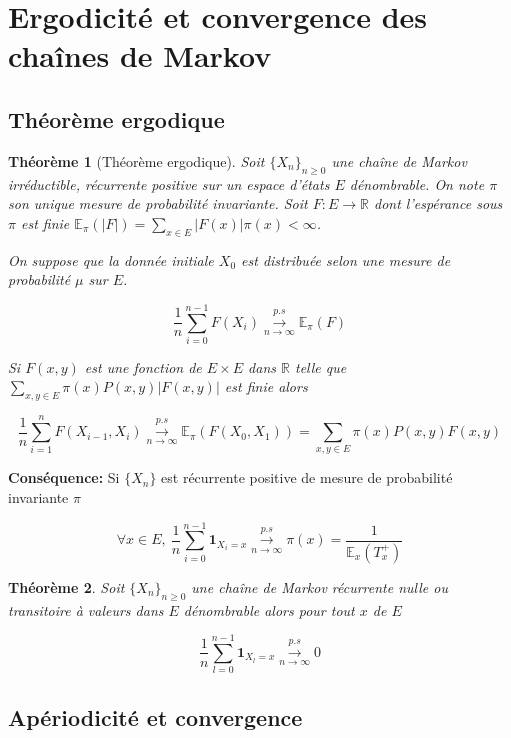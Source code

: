 \documentclass[10pt,a4paper,oneside]{article}
\newtheorem{theoreme}{Théorème}
\begin{document}
\section{Ergodicité et convergence des chaînes de Markov}

\subsection{Théorème ergodique}

\begin{theoreme}[Théorème ergodique]
Soit $\{ X_n \}_{n \geq 0}$ une chaîne de Markov irréductible, récurrente positive sur un espace d'états $E$ dénombrable. On note $\pi$ son unique mesure de probabilité invariante. Soit $F:E \to \mathbb{R}$ dont l'espérance sous $\pi$ est finie $\mathbb{E}_\pi(|F|) = \sum_{x \in E} |F(x)| \pi(x) < \infty$.

On suppose que la donnée initiale $X_0$ est distribuée selon une mesure de probabilité $\mu$ sur $E$.

\[ \frac{1}{n} \sum_{i = 0}^{n - 1} F(X_i) \overset{p.s}{ \underset{n \to \infty}{\rightarrow} } \mathbb{E}_\pi(F) \]

Si $F(x,y)$ est une fonction de $E \times E$ dans $\mathbb{R}$ telle que $\sum_{x,y \in E} \pi(x) P(x,y) |F(x,y)|$ est finie alors

\[ \frac{1}{n} \sum_{i = 1}^n F(X_{i - 1},X_i) \overset{p.s}{ \underset{n \to \infty}{\rightarrow} } \mathbb{E}_\pi(F(X_0,X_1)) = \sum_{x,y \in E} \pi(x) P(x,y) F(x,y) \]
\end{theoreme}

\textbf{Conséquence:} Si $\{ X_n \}$ est récurrente positive de mesure de probabilité invariante $\pi$

\[ \forall x \in E,\ \frac{1}{n} \sum_{i = 0}^{n - 1} \textbf{1}_{X_i = x} \overset{p.s}{ \underset{n \to \infty}{\rightarrow} } \pi(x) = \frac{1}{\mathbb{E}_x(T_x^+)} \]

\begin{theoreme}
Soit $\{ X_n \}_{n \geq 0}$ une chaîne de Markov récurrente nulle ou transitoire à valeurs dans $E$ dénombrable alors pour tout $x$ de $E$

\[ \frac{1}{n} \sum_{l = 0}^{n - 1} \textbf{1}_{X_l = x} \overset{p.s}{ \underset{n \to \infty}{\rightarrow} } 0 \]
\end{theoreme}

\subsection{Apériodicité et convergence}
\end{document}
